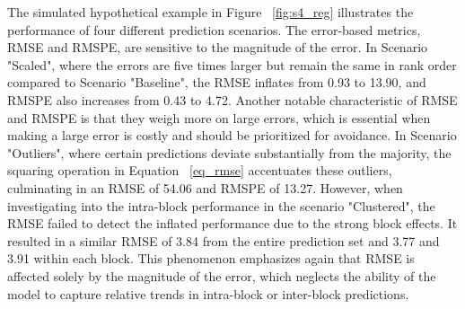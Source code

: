 The simulated hypothetical example in Figure ~\ref{fig:s4_reg} illustrates the performance of four different prediction scenarios. The error-based metrics, RMSE and RMSPE, are sensitive to the magnitude of the error. In Scenario "Scaled", where the errors are five times larger but remain the same in rank order compared to Scenario "Baseline", the RMSE inflates from 0.93 to 13.90, and RMSPE also increases from 0.43 to 4.72. Another notable characteristic of RMSE and RMSPE is that they weigh more on large errors, which is essential when making a large error is costly and should be prioritized for avoidance. In Scenario "Outliers", where certain predictions deviate substantially from the majority, the squaring operation in Equation ~\ref{eq_rmse} accentuates these outliers, culminating in an RMSE of 54.06 and RMSPE of 13.27. However, when investigating into the intra-block performance in the scenario "Clustered", the RMSE failed to detect the inflated performance due to the strong block effects. It resulted in a similar RMSE of 3.84 from the entire prediction set and 3.77 and 3.91 within each block. This phenomenon emphasizes again that RMSE is affected solely by the magnitude of the error, which neglects the ability of the model to capture relative trends in intra-block or inter-block predictions.
